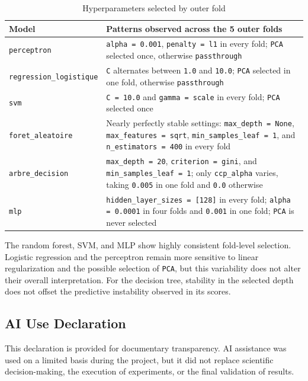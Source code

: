 \begin{table}[H]
\centering
\begin{tabular}{|l|>{\raggedright\arraybackslash}p{10.5cm}|}
\hline
\textbf{Model} & \textbf{Patterns observed across the 5 outer folds} \\
\hline
\texttt{perceptron} & \texttt{alpha = 0.001}, \texttt{penalty = l1} in every fold; \texttt{PCA} selected once, otherwise \texttt{passthrough} \\
\hline
\texttt{regression\_logistique} & \texttt{C} alternates between \texttt{1.0} and \texttt{10.0}; \texttt{PCA} selected in one fold, otherwise \texttt{passthrough} \\
\hline
\texttt{svm} & \texttt{C = 10.0} and \texttt{gamma = scale} in every fold; \texttt{PCA} selected once \\
\hline
\texttt{foret\_aleatoire} & Nearly perfectly stable settings: \texttt{max\_depth = None}, \texttt{max\_features = sqrt}, \texttt{min\_samples\_leaf = 1}, and \texttt{n\_estimators = 400} in every fold \\
\hline
\texttt{arbre\_decision} & \texttt{max\_depth = 20}, \texttt{criterion = gini}, and \texttt{min\_samples\_leaf = 1}; only \texttt{ccp\_alpha} varies, taking \texttt{0.005} in one fold and \texttt{0.0} otherwise \\
\hline
\texttt{mlp} & \texttt{hidden\_layer\_sizes = [128]} in every fold; \texttt{alpha = 0.0001} in four folds and \texttt{0.001} in one fold; \texttt{PCA} is never selected \\
\hline
\end{tabular}
\caption{Hyperparameters selected by outer fold}
\end{table}

The random forest, SVM, and MLP show highly consistent fold-level selection. Logistic regression and the perceptron remain more sensitive to linear regularization and the possible selection of \texttt{PCA}, but this variability does not alter their overall interpretation. For the decision tree, stability in the selected depth does not offset the predictive instability observed in its scores.

\subsection{AI Use Declaration}
This declaration is provided for documentary transparency. AI assistance was used on a limited basis during the project, but it did not replace scientific decision-making, the execution of experiments, or the final validation of results.

